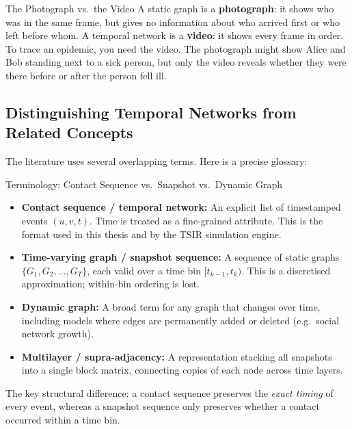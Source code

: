 \begin{analogybox}{The Photograph vs.\ the Video}
A static graph is a \textbf{photograph}: it shows who was in the same frame, but gives no
information about who arrived first or who left before whom. A temporal network is a
\textbf{video}: it shows every frame in order. To trace an epidemic, you need the video. The
photograph might show Alice and Bob standing next to a sick person, but only the video reveals
whether they were there before or after the person fell ill.
\end{analogybox}

\subsection{Distinguishing Temporal Networks from Related Concepts}

The literature uses several overlapping terms. Here is a precise glossary:

\begin{conceptbox}{Terminology: Contact Sequence vs.\ Snapshot vs.\ Dynamic Graph}
\begin{itemize}[noitemsep]
  \item \textbf{Contact sequence / temporal network:} An explicit list of timestamped events
        $(u, v, t)$. Time is treated as a fine-grained attribute. This is the format used in
        this thesis and by the TSIR simulation engine.
  \item \textbf{Time-varying graph / snapshot sequence:} A sequence of static graphs
        $\{G_1, G_2, \ldots, G_T\}$, each valid over a time bin
        $[t_{k-1}, t_k)$. This is a discretised approximation; within-bin ordering is lost.
  \item \textbf{Dynamic graph:} A broad term for any graph that changes over time, including
        models where edges are permanently added or deleted (e.g.\ social network growth).
  \item \textbf{Multilayer / supra-adjacency:} A representation stacking all snapshots into a
        single block matrix, connecting copies of each node across time layers.
\end{itemize}
The key structural difference: a contact sequence preserves the \textit{exact timing} of every
event, whereas a snapshot sequence only preserves whether a contact occurred within a time bin.
\end{conceptbox}

